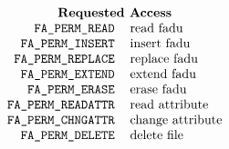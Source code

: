 
\normalsize
\[\begin{tabular}{rl}
    \multicolumn{2}{c}{\bf Requested Access}\\
    \tt FA\_PERM\_READ&		read fadu\\
    \tt FA\_PERM\_INSERT&	insert fadu\\
    \tt FA\_PERM\_REPLACE&	replace fadu\\
    \tt FA\_PERM\_EXTEND&	extend fadu\\
    \tt FA\_PERM\_ERASE&	erase fadu\\
    \tt FA\_PERM\_READATTR&	read attribute\\
    \tt FA\_PERM\_CHNGATTR&	change attribute\\
    \tt FA\_PERM\_DELETE&	delete file\\
\end{tabular}\]
